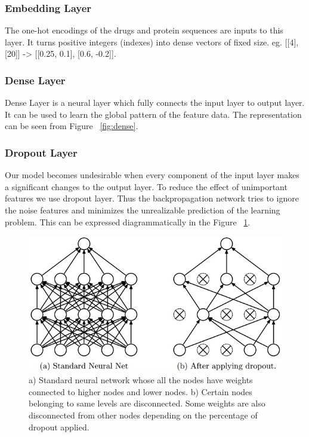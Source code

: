   \subsubsection{Embedding Layer}
  The one-hot encodings of the drugs and protein sequences are inputs to this layer. It turns positive integers (indexes) into dense vectors of fixed size. eg. [[4], [20]] -> [[0.25, 0.1], [0.6, -0.2]].
  
  \subsubsection{Dense Layer}
  Dense Layer is a neural layer which fully connects the input layer to output layer. It can be used to learn the global pattern of the feature data. The representation can be seen from Figure ~\ref{fig:dense}.
  
  
  \subsubsection{Dropout Layer}
  Our model becomes undesirable when every component of the input layer makes a significant changes to the output layer. To reduce the effect of unimportant features we use dropout layer. Thus the backpropagation network tries to ignore the noise features and minimizes the unrealizable prediction of the learning problem. This can be expressed diagrammatically in the Figure ~\ref{fig:dropout}.
  \begin{figure}
    [ht] \centering
    \includegraphics[width=.5\linewidth]{mainmatter/3-Methodology/images/dropout.jpeg}
    \caption[Dropout Layer]{a) Standard neural network whose all the nodes have weights connected to higher nodes and lower nodes. b) Certain nodes belonging to same levels are disconnected. Some weights are also disconnected from other nodes depending on the percentage of dropout applied.}
    \label{fig:dropout}
  
  \end{figure}
  
